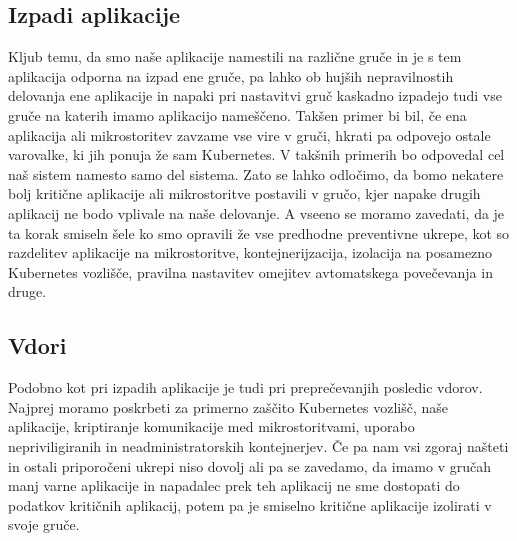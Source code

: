 \documentclass[a4paper, 12pt]{book}
\begin{document}
\subsection{Izpadi aplikacije}
Kljub temu, da smo naše aplikacije namestili na različne gruče in je s tem aplikacija odporna na izpad ene gruče, pa lahko ob hujših nepravilnostih delovanja ene aplikacije in napaki pri nastavitvi gruč kaskadno izpadejo tudi vse gruče na katerih imamo aplikacijo nameščeno.
Takšen primer bi bil, če ena aplikacija ali mikrostoritev zavzame vse vire v gruči, hkrati pa odpovejo ostale varovalke, ki jih ponuja že sam Kubernetes.
V takšnih primerih bo odpovedal cel naš sistem namesto samo del sistema.
Zato se lahko odločimo, da bomo nekatere bolj kritične aplikacije ali mikrostoritve postavili v gručo, kjer napake drugih aplikacij ne bodo vplivale na naše delovanje.
A vseeno se moramo zavedati, da je ta korak smiseln šele ko smo opravili že vse predhodne preventivne ukrepe, kot so razdelitev aplikacije na mikrostoritve, kontejnerijzacija, izolacija na posamezno Kubernetes vozlišče, pravilna nastavitev omejitev avtomatskega povečevanja in druge.
\subsection{Vdori}
Podobno kot pri izpadih aplikacije je tudi pri preprečevanjih posledic vdorov.
Najprej moramo poskrbeti za primerno zaščito Kubernetes vozlišč, naše aplikacije, kriptiranje komunikacije med mikrostoritvami, uporabo nepriviligiranih in neadministratorskih kontejnerjev.
Če pa nam vsi zgoraj našteti in ostali priporočeni ukrepi niso dovolj ali pa se zavedamo, da imamo v gručah manj varne aplikacije in napadalec prek teh aplikacij ne sme dostopati do podatkov kritičnih aplikacij, potem pa je smiselno kritične aplikacije izolirati v svoje gruče.
\end{document}
